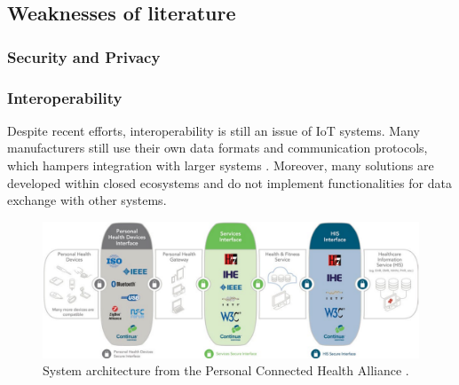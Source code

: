 \subsection{Weaknesses of literature}

\subsubsection{Security and Privacy}


\subsubsection{Interoperability}


Despite recent efforts, interoperability is still an issue of IoT systems. Many manufacturers still use their own data formats and communication protocols, which hampers integration with larger systems \cite{Rubi2019}.
Moreover, many solutions are developed within closed ecosystems and do not implement functionalities for data exchange with other systems. 





\begin{figure}[H]
    \centering
    \includegraphics[width=.90\linewidth]{images/cdg-architecutre.png}
    \caption{System architecture from the Personal Connected Health Alliance \cite{ContinuaHealthAlliance}.}
    \label{fig:continua-architecture}
\end{figure}

